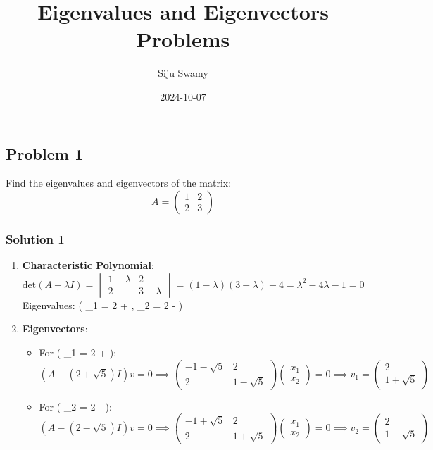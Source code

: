 \documentclass[
  letterpaper,
  DIV=11,
  numbers=noendperiod]{scrartcl}
\title{Eigenvalues and Eigenvectors Problems}
\author{Siju Swamy}
\date{2024-10-07}
\providecommand{\tightlist}{%
  \setlength{\itemsep}{0pt}\setlength{\parskip}{0pt}}\usepackage{longtable,booktabs,array}
\begin{document}
\maketitle


\subsection{Problem 1}\label{problem-1}

Find the eigenvalues and eigenvectors of the matrix: \[
A = \begin{pmatrix} 1 & 2 \\ 2 & 3 \end{pmatrix}
\]

\subsubsection{Solution 1}\label{solution-1}

\begin{enumerate}
\def\labelenumi{\arabic{enumi}.}
\item
  \textbf{Characteristic Polynomial}: \[
  \text{det}(A - \lambda I) = \begin{vmatrix} 1 - \lambda & 2 \\ 2 & 3 - \lambda \end{vmatrix} = (1 - \lambda)(3 - \lambda) - 4 = \lambda^2 - 4\lambda - 1 = 0
  \] Eigenvalues: ( \lambda\_1 = 2 + , \lambda\_2 = 2 - 
  )
\item
  \textbf{Eigenvectors}:

  \begin{itemize}
  \tightlist
  \item
    For ( \lambda\_1 = 2 +  ): \[
    (A - (2 + \sqrt{5})I)v = 0 \implies \begin{pmatrix} -1 - \sqrt{5} & 2 \\ 2 & 1 - \sqrt{5} \end{pmatrix}\begin{pmatrix} x_1 \\ x_2 \end{pmatrix} = 0 \implies v_1 = \begin{pmatrix} 2 \\ 1 + \sqrt{5} \end{pmatrix}
    \]
  \item
    For ( \lambda\_2 = 2 -  ): \[
    (A - (2 - \sqrt{5})I)v = 0 \implies \begin{pmatrix} -1 + \sqrt{5} & 2 \\ 2 & 1 + \sqrt{5} \end{pmatrix}\begin{pmatrix} x_1 \\ x_2 \end{pmatrix} = 0 \implies v_2 = \begin{pmatrix} 2 \\ 1 - \sqrt{5} \end{pmatrix}
    \]
  \end{itemize}
\end{enumerate}
\end{document}

